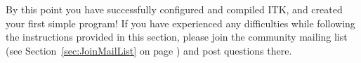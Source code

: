 

By this point you have successfully configured and compiled ITK, and created
your first simple program! If you have experienced any difficulties while
following the instructions provided in this section, please join the community
mailing list (see Section~\ref{sec:JoinMailList} on
page \pageref{sec:JoinMailList}) and post questions there.

